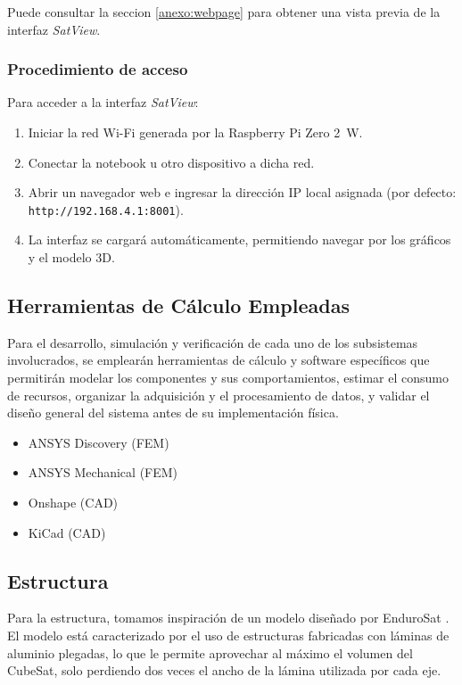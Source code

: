     Puede consultar la seccion \ref{anexo:webpage} para obtener una vista previa de la interfaz \emph{SatView}.

    \subsubsection{Procedimiento de acceso}
      Para acceder a la interfaz \emph{SatView}:
      \begin{enumerate}
        \item Iniciar la red Wi-Fi generada por la Raspberry Pi Zero 2~W.
        \item Conectar la notebook u otro dispositivo a dicha red.
        \item Abrir un navegador web e ingresar la dirección IP local asignada (por defecto:
          \texttt{http://192.168.4.1:8001}).
        \item La interfaz se cargará automáticamente, permitiendo navegar por los gráficos y el modelo 3D.
      \end{enumerate}
 
  \subsection{Herramientas de Cálculo Empleadas}
    Para el desarrollo, simulación y verificación de cada uno de los subsistemas involucrados, se emplearán herramientas
    de cálculo y software específicos que permitirán modelar los componentes y sus comportamientos, estimar el consumo
    de recursos, organizar la adquisición y el procesamiento de datos, y validar el diseño general del sistema antes de
    su implementación física.

    \begin{itemize}
      \item ANSYS Discovery (FEM)
      \item ANSYS Mechanical (FEM)
      \item Onshape (CAD)
      \item KiCad (CAD)
    \end{itemize}

  \subsection{Estructura}
    Para la estructura, tomamos inspiración de un modelo diseñado por EnduroSat \cite{endurosat}. El modelo está
    caracterizado por el uso de estructuras fabricadas con láminas de aluminio plegadas, lo que le permite aprovechar al
    máximo el volumen del CubeSat, solo perdiendo dos veces el ancho de la lámina utilizada por cada eje.

